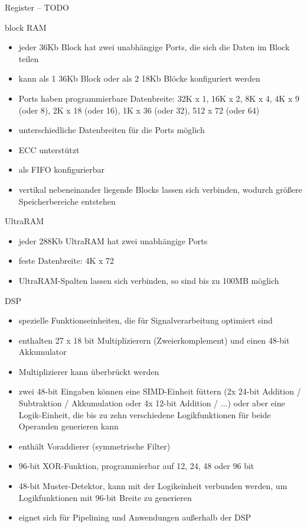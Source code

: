 Register -- TODO

block RAM
\begin{itemize}
    \item jeder 36Kb Block hat zwei unabhängige Ports, die sich die Daten im Block teilen
    \item kann als 1 36Kb Block oder als 2 18Kb Blöcke konfiguriert werden
    \item Ports haben programmierbare Datenbreite: 32K x 1, 16K x 2, 8K x 4, 4K x 9 (oder 8), 2K x 18 (oder 16), 1K x 36 (oder 32), 512 x 72 (oder 64)
    \item unterschiedliche Datenbreiten für die Ports möglich
    \item ECC unterstützt
    \item als FIFO konfigurierbar
    \item vertikal nebeneinander liegende Blocks lassen sich verbinden, wodurch größere Speicherbereiche entstehen
\end{itemize}

UltraRAM
\begin{itemize}
    \item jeder 288Kb UltraRAM hat zwei unabhängige Ports
    \item feste Datenbreite: 4K x 72
    \item UltraRAM-Spalten lassen sich verbinden, so sind bis zu 100MB möglich
\end{itemize}

DSP
\begin{itemize}
    \item spezielle Funktionseinheiten, die für Signalverarbeitung optimiert sind
    \item enthalten 27 x 18 bit Multiplizierern (Zweierkomplement) und einen 48-bit Akkumulator
    \item Multiplizierer kann überbrückt werden
    \item zwei 48-bit Eingaben können eine SIMD-Einheit füttern (2x 24-bit Addition / Subtraktion / Akkumulation oder 4x 12-bit Addition / ...) oder aber eine Logik-Einheit, die bis zu zehn verschiedene Logikfunktionen für beide Operanden generieren kann
    \item enthält Voraddierer (symmetrische Filter)
    \item 96-bit XOR-Funktion, programmierbar auf 12, 24, 48 oder 96 bit
    \item 48-bit Muster-Detektor, kann mit der Logikeinheit verbunden werden, um Logikfunktionen mit 96-bit Breite zu generieren
    \item eignet sich für Pipelining und Anwendungen außerhalb der DSP
\end{itemize}

